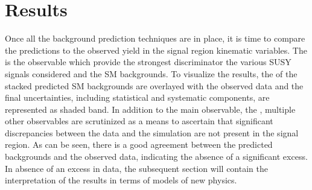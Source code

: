 \section{Results}
\noindent\justify
Once all the background prediction techniques are in place, it is time to compare the predictions to the observed yield in the signal region kinematic variables. 
The \ptmiss is the observable which provide the strongest discriminator the various SUSY signals considered and the SM backgrounds. 
To visualize the results, the \ptmiss of the stacked predicted SM backgrounds are overlayed with the observed data and the final uncertainties, including statistical and systematic components, are represented as shaded band. 
In addition to the main observable, the \ptmiss, multiple other observables are scrutinized as a means to ascertain that significant discrepancies between the data and the simulation are not present in the signal region.
As can be seen, there is a good agreement between the predicted backgrounds and the observed data, indicating the absence of a significant excess. 
In absence of an excess in data, the subsequent section will contain the interpretation of the results in terms of models of new physics.                                              
